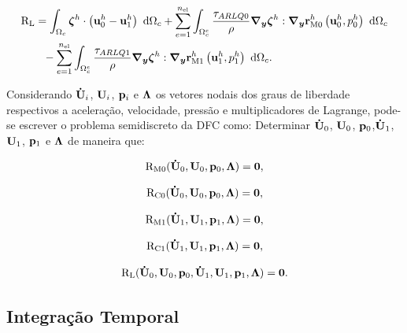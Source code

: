 \documentclass[tese_patricia]{subfiles}
\begin{document}
\begin{align}
	\begin{split}
		&\mathrm{R}_\mathrm{L} = \int_{\Omega_c}  \boldsymbol{\zeta}^h  \cdot \left(\mathbf{u}_0^h - \mathbf{u}_1^h \right) \ \mathrm{d} \Omega_c + \sum_{e=1}^{n_{\mathrm{el}}} \int_{\Omega^e_{c}} \frac{\tau_{ARLQ0}}{\rho} \boldsymbol{\nabla_y} \boldsymbol{\zeta}^h : \boldsymbol{\nabla_y} \mathbf{r}_{\mathrm{M0}}^{h}\left(\mathbf{u}_0^h,p_0^h\right) \ \mathrm{d} \Omega_c\\
		&\qquad - \sum_{e=1}^{n_{\mathrm{el}}} \int_{\Omega^e_{c}} \frac{\tau_{ARLQ1}}{\rho} \boldsymbol{\nabla_y} \boldsymbol{\zeta}^h : \boldsymbol{\nabla_y} \mathbf{r}_{\mathrm{M1}}^{h}\left(\mathbf{u}_1^h,p_1^h\right) \ \mathrm{d} \Omega_c.
	\end{split}
\end{align}

Considerando $\mathbf{\dot{U}}_i$, $\mathbf{U}_i$, $\mathbf{p}_i$ e $\boldsymbol{\Lambda}$ os vetores nodais dos graus de liberdade respectivos a aceleração, velocidade, pressão e multiplicadores de Lagrange, pode-se escrever o problema semidiscreto da DFC como: Determinar $\mathbf{\dot{U}}_0$, $\mathbf{U}_0$, $\mathbf{p}_0$,$\mathbf{\dot{U}}_1$, $\mathbf{U}_1$, $\mathbf{p}_1$ e $\boldsymbol{\Lambda}$ de maneira que:

\begin{align}
	\mathrm{R}_\mathrm{M0}(\mathbf{\dot{U}}_0,\mathbf{U}_0,\mathbf{p}_0,\boldsymbol{\Lambda}) = \mathbf{0}, \label{eq:resid_semi_discr_QM_0}
\end{align}

\begin{align}
	\mathrm{R}_\mathrm{C0}(\mathbf{\dot{U}}_0,\mathbf{U}_0,\mathbf{p}_0,\boldsymbol{\Lambda}) = \mathbf{0}, 
\end{align}

\begin{align}
	\mathrm{R}_\mathrm{M1}(\mathbf{\dot{U}}_1,\mathbf{U}_1,\mathbf{p}_1,\boldsymbol{\Lambda}) = \mathbf{0},
\end{align}

\begin{align}
	\mathrm{R}_\mathrm{C1}(\mathbf{\dot{U}}_1,\mathbf{U}_1,\mathbf{p}_1,\boldsymbol{\Lambda}) = \mathbf{0},
\end{align}

\begin{align}
	\mathrm{R}_\mathrm{L}(\mathbf{\dot{U}}_0,\mathbf{U}_0,\mathbf{p}_0,\mathbf{\dot{U}}_1,\mathbf{U}_1,\mathbf{p}_1,\boldsymbol{\Lambda}) = \mathbf{0}. \label{eq:resid_semi_discr_acopla}
\end{align}


\subsection{Integração Temporal}
\end{document}
